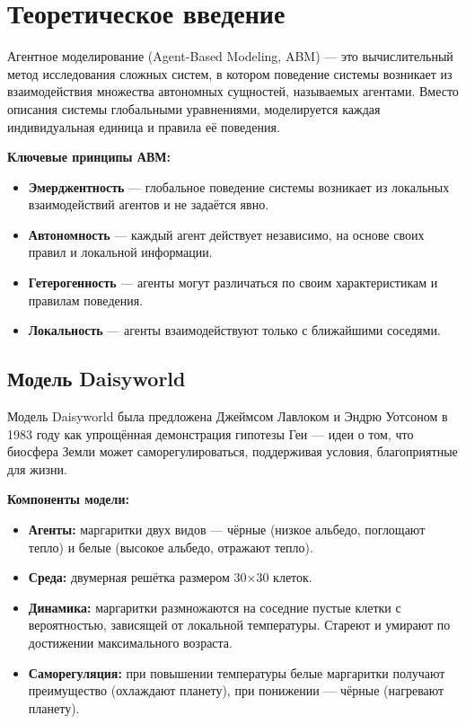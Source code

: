 \documentclass[
  12pt,
  a4paper,
  DIV=11,
  numbers=noendperiod]{scrreprt}
\providecommand{\tightlist}{%
  \setlength{\itemsep}{0pt}\setlength{\parskip}{0pt}}\usepackage{longtable,booktabs,array}
\begin{document}
\chapter{Теоретическое
введение}\label{ux442ux435ux43eux440ux435ux442ux438ux447ux435ux441ux43aux43eux435-ux432ux432ux435ux434ux435ux43dux438ux435}

Агентное моделирование (Agent-Based Modeling, ABM) --- это
вычислительный метод исследования сложных систем, в котором поведение
системы возникает из взаимодействия множества автономных сущностей,
называемых агентами. Вместо описания системы глобальными уравнениями,
моделируется каждая индивидуальная единица и правила её поведения.

\textbf{Ключевые принципы АВМ:}

\begin{itemize}
\tightlist
\item
  \textbf{Эмерджентность} --- глобальное поведение системы возникает из
  локальных взаимодействий агентов и не задаётся явно.
\item
  \textbf{Автономность} --- каждый агент действует независимо, на основе
  своих правил и локальной информации.
\item
  \textbf{Гетерогенность} --- агенты могут различаться по своим
  характеристикам и правилам поведения.
\item
  \textbf{Локальность} --- агенты взаимодействуют только с ближайшими
  соседями.
\end{itemize}

\section{Модель
Daisyworld}\label{ux43cux43eux434ux435ux43bux44c-daisyworld}

Модель Daisyworld была предложена Джеймсом Лавлоком и Эндрю Уотсоном в
1983 году как упрощённая демонстрация гипотезы Геи --- идеи о том, что
биосфера Земли может саморегулироваться, поддерживая условия,
благоприятные для жизни.

\textbf{Компоненты модели:}

\begin{itemize}
\tightlist
\item
  \textbf{Агенты:} маргаритки двух видов --- чёрные (низкое альбедо,
  поглощают тепло) и белые (высокое альбедо, отражают тепло).
\item
  \textbf{Среда:} двумерная решётка размером 30×30 клеток.
\item
  \textbf{Динамика:} маргаритки размножаются на соседние пустые клетки с
  вероятностью, зависящей от локальной температуры. Стареют и умирают по
  достижении максимального возраста.
\item
  \textbf{Саморегуляция:} при повышении температуры белые маргаритки
  получают преимущество (охлаждают планету), при понижении --- чёрные
  (нагревают планету).
\end{itemize}
\end{document}
